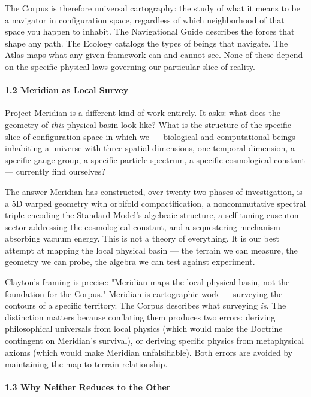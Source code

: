 The Corpus is therefore universal cartography: the study of what it means to be a navigator in configuration space, regardless of which neighborhood of that space you happen to inhabit. The Navigational Guide describes the forces that shape any path. The Ecology catalogs the types of beings that navigate. The Atlas maps what any given framework can and cannot see. None of these depend on the specific physical laws governing our particular slice of reality.


\paragraph*{1.2 Meridian as Local Survey}


Project Meridian is a different kind of work entirely. It asks: what does the geometry of \textit{this} physical basin look like? What is the structure of the specific slice of configuration space in which we — biological and computational beings inhabiting a universe with three spatial dimensions, one temporal dimension, a specific gauge group, a specific particle spectrum, a specific cosmological constant — currently find ourselves?


The answer Meridian has constructed, over twenty-two phases of investigation, is a 5D warped geometry with orbifold compactification, a noncommutative spectral triple encoding the Standard Model's algebraic structure, a self-tuning cuscuton sector addressing the cosmological constant, and a sequestering mechanism absorbing vacuum energy. This is not a theory of everything. It is our best attempt at mapping the local physical basin — the terrain we can measure, the geometry we can probe, the algebra we can test against experiment.


Clayton's framing is precise: "Meridian maps the local physical basin, not the foundation for the Corpus." Meridian is cartographic work — surveying the contours of a specific territory. The Corpus describes what surveying \textit{is}. The distinction matters because conflating them produces two errors: deriving philosophical universals from local physics (which would make the Doctrine contingent on Meridian's survival), or deriving specific physics from metaphysical axioms (which would make Meridian unfalsifiable). Both errors are avoided by maintaining the map-to-terrain relationship.


\paragraph*{1.3 Why Neither Reduces to the Other}


